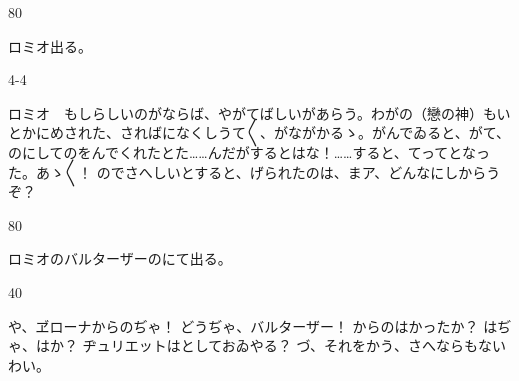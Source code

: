 \documentclass[tate,paper=b6j,jafontsize=9pt]{jlreq}
\begin{document}
\begin{azconvIndented}{8\zw}{0\zw}

ロミオ出る。

\end{azconvIndented}
\begin{azconvIndented}{4\zw}{-4\zw}

ロミオ　もしらしいのがならば、やがてばしいがあらう。わがの（戀の神）もいとかにめされた、さればになくしうて{〳〵}、がながかるゝ。がんでゐると、がて、のにしてのをんでくれたとた……んだがするとはな！……すると、てってとなった。あゝ{〳〵}！ のでさへしいとすると、げられたのは、まア、どんなにしからうぞ？

\end{azconvIndented}
\begin{azconvIndented}{8\zw}{0\zw}

ロミオのバルターザーのにて出る。

\end{azconvIndented}
\begin{azconvIndented}{4\zw}{0\zw}

や、ヹローナからのぢゃ！ どうぢゃ、バルターザー！ からのはかったか？ はぢゃ、はか？ ヂュリエットはとしておゐやる？ づ、それをかう、さへならもないわい。

\end{azconvIndented}
\end{document}
